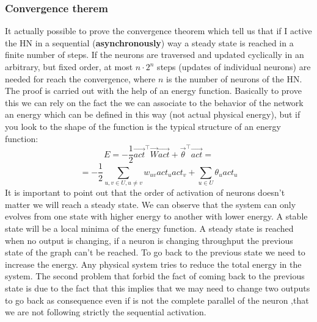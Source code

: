 \documentclass{article}
\begin{document}
\subsubsection{Convergence therem}
It actually possible to prove the convergence theorem which tell us that if I active the HN
in a sequential (\textbf{asynchronously}) way a steady state is reached in a finite number of steps.
\newline\newline
If the neurons are traversed and updated cyclically in
an arbitrary, but fixed order, at most $n\cdot2^n$ steps (updates of individual
neurons) are needed for reach the convergence, where $n$ is the number of neurons of the HN.
\newline\newline
The proof is carried out with the help of an energy function.
Basically to prove this we can rely on the fact the we can associate to the behavior of the network
an energy which can be defined in this way (not actual physical energy), but if you look
to the shape of the function is the typical structure of an energy function:
$$E=-\frac{1}{2}\vec{act}^\top \vec{W}\vec{act}+\vec{\theta}^\top\vec{act}=$$
$$=-\frac{1}{2}\sum_{u,v\in U,u\neq v}w_{uv}act_u act_v+\sum_{u\in U}\theta_u act_u$$
It is important to point out that the order of activation of neurons doesn't matter we will
reach a steady state.
\newline\newline
We can observe that the system can only evolves from one state with higher energy to another
with lower energy. A stable state will be a local minima of the energy function.
\newline\newline
A steady state is reached when no output is changing, if a neuron is changing throughput
the previous state of the graph can't
be reached. To go back to the previous state we need to increase the energy. Any physical system
tries to reduce the total energy in the system. The second problem that forbid the fact of
coming back to the previous state is due to the fact that this implies that we may need
to change two outputs to go back as consequence even if is not the complete parallel of the
neuron ,that we are not following strictly the sequential activation.
\end{document}
